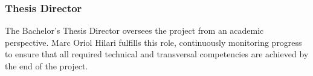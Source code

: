 \subsubsection{Thesis Director}

The Bachelor's Thesis Director oversees the project from an academic perspective. Marc Oriol Hilari fulfills this role, continuously monitoring progress to ensure that all required technical and transversal competencies are achieved by the end of the project.